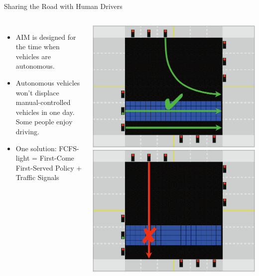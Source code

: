 \documentclass{beamer}
\begin{document}
\begin{frame}{Sharing the Road with Human Drivers}
\begin{columns}[c]
\begin{itemize}
\item AIM is designed for the time when vehicles are autonomous.
\item Autonomous vehicles won’t displace manual-controlled vehicles in one
day. Some people enjoy driving.
\item One solution: FCFS-light = First-Come First-Served Policy + Traffic Signals
\end{itemize}
\includegraphics[width=\textwidth]{fcfs-light-1.png}
\hfill
\includegraphics[width=\textwidth]{fcfs-light-2.png}
\end{columns}
\end{frame}
\end{document}
